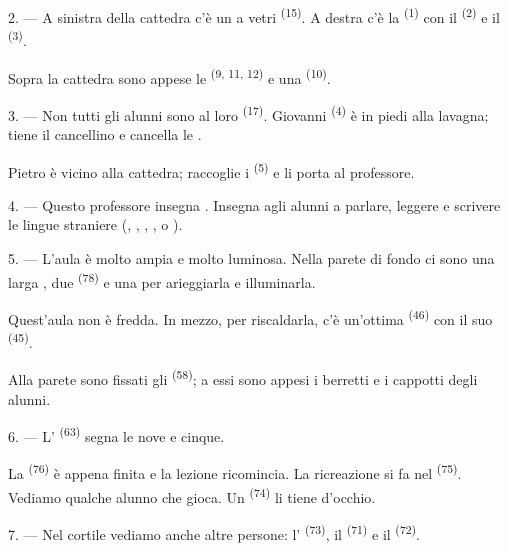 2. --- A sinistra della cattedra c'è un  a vetri
\textsuperscript{(15)}. A destra c'è la  \textsuperscript{(1)} con il
 \textsuperscript{(2)} e il  \textsuperscript{(3)}.

Sopra la cattedra sono appese le  \textsuperscript{(9, 11, 12)}
e una  \textsuperscript{(10)}.

3. --- Non tutti gli alunni sono al loro  \textsuperscript{(17)}.
Giovanni \textsuperscript{(4)} è in piedi alla lavagna; tiene il cancellino e
cancella le .

Pietro è vicino alla cattedra; raccoglie i 
\textsuperscript{(5)} e li porta al professore.

4. --- Questo professore insegna . Insegna agli alunni a
parlare, leggere e scrivere le lingue straniere (, ,
, ,  o ).

5. --- L'aula è molto ampia e molto luminosa. Nella parete di fondo ci sono una larga
, due  \textsuperscript{(78)} e una
 per arieggiarla e illuminarla.

Quest'aula non è fredda. In mezzo, per riscaldarla, c'è un'ottima 
\textsuperscript{(46)} con il suo  \textsuperscript{(45)}.

Alla parete sono fissati gli  \textsuperscript{(58)}; a essi sono
appesi i berretti e i cappotti degli alunni.

\VUsaut{5.2mm}
\VUsaut{3.6mm}

6. --- L' \textsuperscript{(63)} segna le nove e cinque.

La  \textsuperscript{(76)} è appena finita e la lezione ricomincia.
La ricreazione si fa nel  \textsuperscript{(75)}. Vediamo qualche
alunno che gioca. Un  \textsuperscript{(74)} li tiene d'occhio.

7. --- Nel cortile vediamo anche altre persone: l'
\textsuperscript{(73)}, il  \textsuperscript{(71)} e il
 \textsuperscript{(72)}.

